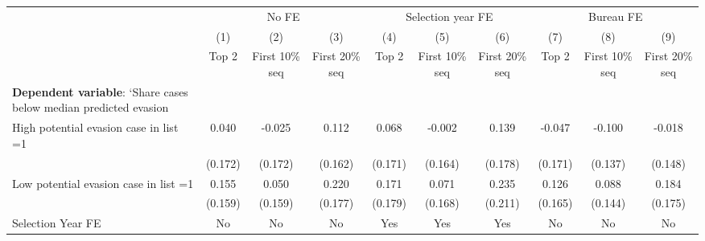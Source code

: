 {
\def\sym#1{\ifmmode^{#1}\else\(^{#1}\)\fi}
\begin{tabular}{l*{9}{c}}
\toprule
            &\multicolumn{3}{c}{No FE}                                        &\multicolumn{3}{c}{Selection year FE}                            &\multicolumn{3}{c}{Bureau FE}                                    \\\cmidrule(lr){2-4}\cmidrule(lr){5-7}\cmidrule(lr){8-10}
            &\multicolumn{1}{c}{(1)}&\multicolumn{1}{c}{(2)}&\multicolumn{1}{c}{(3)}&\multicolumn{1}{c}{(4)}&\multicolumn{1}{c}{(5)}&\multicolumn{1}{c}{(6)}&\multicolumn{1}{c}{(7)}&\multicolumn{1}{c}{(8)}&\multicolumn{1}{c}{(9)}\\
            &\multicolumn{1}{c}{Top 2}&\multicolumn{1}{c}{First 10\% seq}&\multicolumn{1}{c}{First 20\% seq}&\multicolumn{1}{c}{Top 2}&\multicolumn{1}{c}{First 10\% seq}&\multicolumn{1}{c}{First 20\% seq}&\multicolumn{1}{c}{Top 2}&\multicolumn{1}{c}{First 10\% seq}&\multicolumn{1}{c}{First 20\% seq}\\
\midrule
\textbf{Dependent variable}: `Share cases below median predicted evasion&                     &                     &                     &                     &                     &                     &                     &                     &                     \\
\addlinespace
High potential evasion case in list =1&       0.040         &      -0.025         &       0.112         &       0.068         &      -0.002         &       0.139         &      -0.047         &      -0.100         &      -0.018         \\
            &     (0.172)         &     (0.172)         &     (0.162)         &     (0.171)         &     (0.164)         &     (0.178)         &     (0.171)         &     (0.137)         &     (0.148)         \\
\addlinespace
Low potential evasion case in list =1&       0.155         &       0.050         &       0.220         &       0.171         &       0.071         &       0.235         &       0.126         &       0.088         &       0.184         \\
            &     (0.159)         &     (0.159)         &     (0.177)         &     (0.179)         &     (0.168)         &     (0.211)         &     (0.165)         &     (0.144)         &     (0.175)         \\
\midrule
Selection Year FE&          No         &          No         &          No         &         Yes         &         Yes         &         Yes         &          No         &          No         &          No         \\

\end{tabular}}
